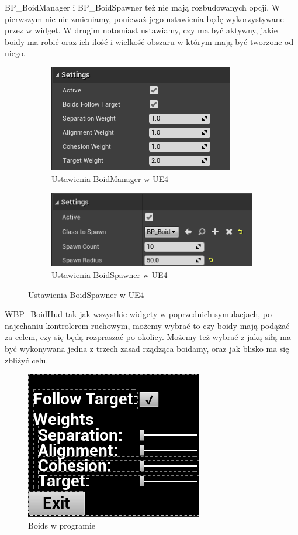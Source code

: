 \documentclass[a4paper,12pt,reqno]{article}
\begin{document}
BP\_BoidManager i BP\_BoidSpawner też nie mają rozbudowanych opcji. W pierwszym nic nie zmieniamy, ponieważ jego ustawienia będę wykorzystywane przez w widget. W drugim notomiast ustawiamy, czy ma być aktywny, jakie boidy ma robić oraz ich ilość i wielkość obszaru w którym mają być tworzone od niego.

\begin{figure}[H]%
	\centering
	\begin{subfigure}{.5\textwidth}
		\centering
		\includegraphics[width=0.8\linewidth]{graphics//boids/BP_BoidManager.png}
		\caption{Ustawienia BoidManager w UE4 }	
		\label{ref:subref_a}
	\end{subfigure}%
	\begin{subfigure}{.5\textwidth}
		\centering
		\includegraphics[width=0.8\linewidth]{graphics//boids/BP_BoidSpawner.png}
		\caption{Ustawienia BoidSpawner w UE4 }
		\label{ref:subref_b}
	\end{subfigure}%
\label{ref:ref}
\end{figure}

WBP\_BoidHud tak jak wszystkie widgety w poprzednich symulacjach, po najechaniu kontrolerem ruchowym, możemy wybrać to czy boidy mają podążać za celem, czy się będą rozpraszać po okolicy. Możemy też wybrać z jaką siłą ma być wykonywana jedna z trzech zasad rządząca boidamy, oraz jak blisko ma się zbliżyć celu. 

\begin{figure}[H]%
\centering
\includegraphics[width=0.55\columnwidth]{graphics/boids/BP_BoidHud.png}
\caption{Boids w programie
\label{BPExample}}%
%
\qquad
\end{figure}  
\end{document}
